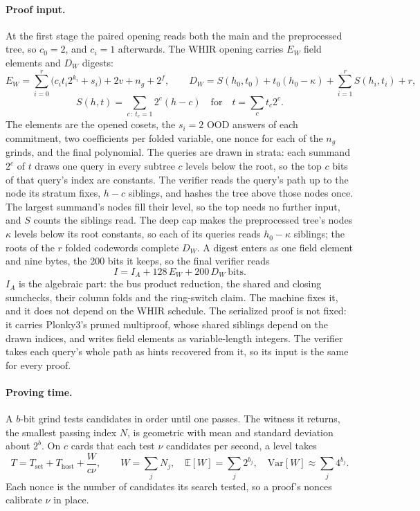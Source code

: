 \documentclass[11pt]{article}
\begin{document}
\paragraph{Proof input.} At the first stage the paired opening reads
both the main and the preprocessed tree, so $c_0=2$, and $c_i=1$ afterwards.
The WHIR opening carries $E_W$ field elements and $D_W$ digests:
\begin{equation}\label{eq:whirsize}
E_W=\sum_{i=0}^{r}\big(c_it_i2^{k_i}+s_i\big)+2v+n_g+2^f,\qquad
D_W=S(h_0,t_0)+t_0(h_0-\kappa)+\sum_{i=1}^{r}S(h_i,t_i)+r,
\end{equation}
\begin{equation}
S(h,t)=\sum_{c\,:\,t_c=1}2^c(h-c)\quad\text{for}\quad t=\sum_ct_c2^c.
\end{equation}
The elements are the opened cosets, the $s_i=2$ OOD answers of each
commitment, two coefficients per folded variable, one nonce for each of the
$n_g$ grinds, and the final polynomial. The queries are drawn in strata:
each summand $2^c$ of $t$ draws one query in every subtree $c$ levels below
the root, so the top $c$ bits of that query's index are constants. The
verifier reads the query's path up to the node its stratum fixes, $h-c$
siblings, and hashes the tree above those nodes once. The largest summand's
nodes fill their level, so the top needs no further input, and $S$ counts
the siblings read. The deep cap makes the preprocessed tree's nodes
$\kappa$ levels below its root constants, so each of its queries reads
$h_0-\kappa$ siblings; the roots of the $r$ folded codewords complete
$D_W$. A digest enters as one field element and nine bytes, the 200 bits
it keeps, so the final verifier reads
\begin{equation}\label{eq:inputbits}
I=I_A+128\,E_W+200\,D_W\ \text{bits}.
\end{equation}
$I_A$ is the algebraic part: the bus product reduction, the shared and
closing sumchecks, their column folds and the ring-switch claim. The machine
fixes it, and it does not depend on the WHIR schedule. The serialized proof
is not fixed: it carries Plonky3's pruned multiproof, whose shared siblings
depend on the drawn indices, and writes field elements as variable-length
integers. The verifier takes each query's whole path as hints recovered
from it, so its input is the same for every proof.

\paragraph{Proving time.} A $b$-bit grind tests candidates in order until one
passes. The witness it returns, the smallest passing index $N$, is geometric
with mean and standard deviation about $2^b$. On $c$ cards that each test
$\nu$ candidates per second, a level takes
\begin{equation}\label{eq:provetime}
T=T_{\mathrm{set}}+T_{\mathrm{host}}+\frac{W}{c\nu},\qquad
W=\sum_jN_j,\quad \mathbb{E}[W]=\sum_j2^{b_j},\quad
\mathrm{Var}[W]\approx\sum_j4^{b_j}.
\end{equation}
Each nonce is the number of candidates its search tested, so a proof's
nonces calibrate $\nu$ in place.
\end{document}
